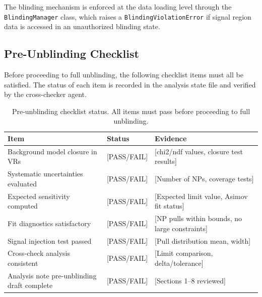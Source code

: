 
The blinding mechanism is enforced at the data loading level through the
\texttt{BlindingManager} class, which raises a \texttt{BlindingViolationError}
if signal region data is accessed in an unauthorized blinding state.

\subsection{Pre-Unblinding Checklist}
\label{sec:blinding:checklist}


Before proceeding to full unblinding, the following checklist items must
all be satisfied. The status of each item is recorded in the analysis
state file and verified by the cross-checker agent.

\begin{table}[htbp]
  \centering
  \caption{Pre-unblinding checklist status. All items must pass before
           proceeding to full unblinding.}
  \label{tab:checklist}
  \begin{tabular}{p{5cm}lp{6cm}}
    \toprule
    Item & Status & Evidence \\
    \midrule
    Background model closure in VRs
      & [PASS/FAIL]
      & [chi2/ndf values, closure test results] \\
    \addlinespace
    Systematic uncertainties evaluated
      & [PASS/FAIL]
      & [Number of NPs, coverage tests] \\
    \addlinespace
    Expected sensitivity computed
      & [PASS/FAIL]
      & [Expected limit value, Asimov fit status] \\
    \addlinespace
    Fit diagnostics satisfactory
      & [PASS/FAIL]
      & [NP pulls within bounds, no large constraints] \\
    \addlinespace
    Signal injection test passed
      & [PASS/FAIL]
      & [Pull distribution mean, width] \\
    \addlinespace
    Cross-check analysis consistent
      & [PASS/FAIL]
      & [Limit comparison, delta/tolerance] \\
    \addlinespace
    Analysis note pre-unblinding draft complete
      & [PASS/FAIL]
      & [Sections 1--8 reviewed] \\
    \bottomrule
  \end{tabular}
\end{table}

